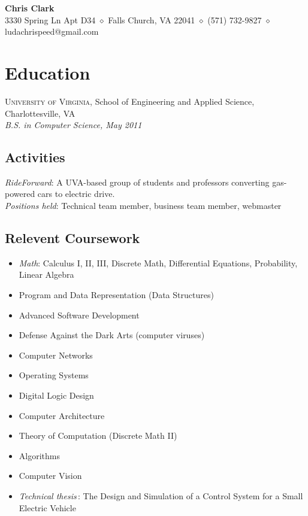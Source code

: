 \documentclass[a4paper,11pt]{article}
\begin{document}
\begin{center}
{\sffamily \huge \textbf{Chris Clark}} \\
3330 Spring Ln Apt D34 $\diamond$ Falls Church, VA 22041 $\diamond$ (571)
732-9827 $\diamond$ ludachrispeed@gmail.com
\end{center}


\section*{Education}

  \textsc{University of Virginia}, School of Engineering and Applied Science,
  Charlottesville, VA \\
  \textit{B.S. in Computer Science, May 2011}

  \subsection*{Activities}

  \textit{RideForward}: A UVA-based group of students and professors converting
  gas-powered cars to electric drive. \\ 
  \textsl{Positions held}: Technical team member, business team member, webmaster

  \subsection*{Relevent Coursework}

  \begin{multicols}{2} \raggedright

    \begin{itemize}
    \item \textit{Math}: Calculus I, II, III, Discrete Math, Differential
      Equations, Probability, Linear Algebra
    \item Program and Data Representation (Data Structures)
    \item Advanced Software Development
    \item Defense Against the Dark Arts (computer viruses)
    \item Computer Networks
    \item Operating Systems
    \item Digital Logic Design
    \item Computer Architecture
    \item Theory of Computation (Discrete Math II)
    \item Algorithms
    \item Computer Vision
    \item \textsl{Technical thesis\,}: The Design and Simulation of a Control
      System for a Small Electric Vehicle
    \end{itemize}
  \end{multicols}
\end{document}
